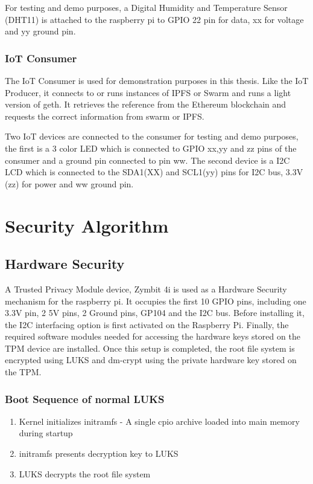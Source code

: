 \documentclass[11pt,openright]{report}
\begin{document}
For testing and demo purposes, a Digital Humidity and Temperature Sensor (DHT11) is attached to the raspberry pi to GPIO 22 pin for data, xx for voltage and yy ground pin.

\subsubsection{IoT Consumer}
The IoT Consumer is used for demonstration purposes in this thesis. Like the IoT Producer, it connects to or runs instances of IPFS or Swarm and runs a light version of geth. It retrieves the reference from the Ethereum blockchain and requests the correct information from swarm or IPFS.

Two IoT devices are connected to the consumer for testing and demo purposes, the first is a 3 color LED which is connected to GPIO xx,yy and zz pins of the consumer and a ground pin connected to pin ww. The second device is a I2C LCD which is connected to the SDA1(XX) and SCL1(yy) pins for I2C bus, 3.3V (zz) for power and ww ground pin.

\section{Security Algorithm}
\subsection{Hardware Security}
A Trusted Privacy Module device, Zymbit 4i is used as a Hardware Security mechanism for the raspberry pi. It occupies the first 10 GPIO pins, including one 3.3V pin, 2 5V pins, 2 Ground pins, GP104 and the I2C bus. Before installing it, the I2C interfacing option is first activated on the Raspberry Pi. Finally, the required software modules needed for accessing the hardware keys stored on the TPM device are installed. Once this setup is completed, the root file system is encrypted using LUKS and dm-crypt using the private hardware key stored on the TPM.

\subsubsection{Boot Sequence of normal LUKS}
\begin{enumerate}
	\item Kernel initializes initramfs - A single cpio archive loaded into main memory during startup
	\item initramfs presents decryption key to LUKS
	\item LUKS decrypts the root file system
\end{enumerate}
\end{document}
